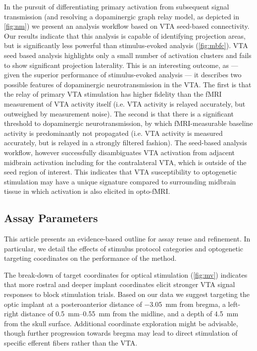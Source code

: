 In the pursuit of differentiating primary activation from subsequent signal transmission (and resolving a dopaminergic graph relay model, as depicted in \cref{fig:nm}) we present an analysis workflow based on VTA seed-based connectivity.
Our results indicate that this analysis is capable of identifying projection areas, but is significantly less powerful than stimulus-evoked analysis (\cref{fig:mbfc}).
VTA seed based analysis highlights only a small number of activation clusters and fails to show significant projection laterality.
This is an interesting outcome, as --- given the superior performance of stimulus-evoked analysis --- it describes two possible features of dopaminergic neurotransmission in the VTA.
The first is that the relay of primary VTA stimulation has higher fidelity than the fMRI measurement of VTA activity itself (i.e. VTA activity is relayed accurately, but outweighed by measurement noise).
The second is that there is a significant threshold to dopaminergic neurotransmission, by which fMRI-measurable baseline activity is predominantly not propagated (i.e. VTA activity is measured accurately, but is relayed in a strongly filtered fashion).
The seed-based analysis workflow, however successfully disambiguates VTA activation from adjacent midbrain activation including for the contralateral VTA, which is outside of the seed region of interest.
This indicates that VTA susceptibility to optogenetic stimulation may have a unique signature compared to surrounding midbrain tissue in which activation is also elicited in opto-fMRI.

\subsection{Assay Parameters}

This article presents an evidence-based outline for assay reuse and refinement.
In particular, we detail the effects of stimulus protocol categories and optogenetic targeting coordinates on the performance of the method.

The break-down of target coordinates for optical stimulation (\cref{fig:mv}) indicates that more rostral and deeper implant coordinates elicit stronger VTA signal responses to block stimulation trials.
Based on our data we suggest targeting the optic implant at
a posteroanterior distance of \SI{-3.05}{\milli\meter} from bregma,
a left-right distance of \SIrange{0.5}{0.55}{\milli\meter} from the midline,
and a depth of \SI{4.5}{\milli\meter} from the skull surface.
Additional coordinate exploration might be advisable, though further progression towards bregma may lead to direct stimulation of specific efferent fibers rather than the VTA.

